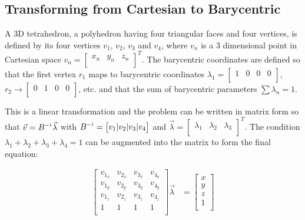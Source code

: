 \subsection{Transforming from Cartesian to Barycentric}

A 3D tetrahedron,  a  polyhedron having four triangular faces and four vertices,
is defined  by its four vertices $v_1$, $v_2$, $v_3$ and $v_4$, where $v_n$ is a
3 dimensional point in Cartesian space $v_n = \begin{bmatrix} x_n & y_n & z_n \\
\end{bmatrix}^T$.  The  barycentric  coordinates  are defined so that the  first
vertex $r_1$ maps to barycentric coordinates $\lambda_1 = \begin{bmatrix} 1  & 0
&  0 & 0 \\ \end{bmatrix}$,  $r_2  \to  \begin{bmatrix}  0  &  1  &  0  &  0  \\
\end{bmatrix}$, etc. and that the sum of barycentric parameters $\sum\lambda_n
= 1$.

This is a linear transformation and the problem can be written in matrix form so
that $\vec{v} = B \inverse \vec{\lambda}$ with $B \inverse = \begin{bmatrix} v_1
|  v_2  |  v_3  |  v_4  \\  \end{bmatrix}$  and $\vec{\lambda} = \begin{bmatrix}
\lambda_1 &  \lambda_2 & \lambda_3 \\ \end{bmatrix}^T$. The condition $\lambda_1
+  \lambda_2  +  \lambda_3 + \lambda_4 = 1$ can be augmented into the matrix  to
form the final equation:

\begin{align*}
    \begin{bmatrix}
        v_{1_x} & v_{2_x} & v_{3_x} & v_{4_x} \\
        v_{1_y} & v_{2_y} & v_{3_y} & v_{4_y} \\
        v_{1_z} & v_{2_z} & v_{3_z} & v_{4_z} \\
        1 & 1 & 1 & 1 \\
    \end{bmatrix}
    \vec{\lambda} &= \begin{bmatrix}
        x \\
        y \\
        z \\
        1 \\
    \end{bmatrix} \\
\end{align*}

